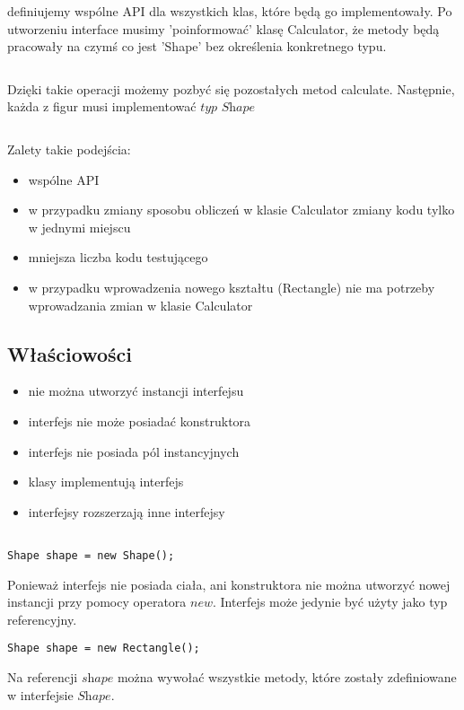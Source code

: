 \documentclass[11pt]{article}
\begin{document}
definiujemy wspólne API dla wszystkich klas, które będą go implementowały. Po utworzeniu interface musimy 'poinformować' klasę Calculator, że metody będą pracowały na czymś co jest 'Shape' bez określenia konkretnego typu. 

\inputminted[bgcolor=bg,linenos=true]{java}{src/w05/CalculatorRefactor.java}

Dzięki takie operacji możemy pozbyć się pozostałych metod calculate. Następnie, każda z figur musi implementować $\textit{typ Shape}$ 

\inputminted[bgcolor=bg,linenos=true]{java}{src/w05/Calculatorinterface.java}

Zalety takie podejścia:
\begin{itemize}
\item wspólne API
\item w przypadku zmiany sposobu obliczeń w klasie Calculator zmiany kodu tylko w jednymi miejscu
\item mniejsza liczba kodu testującego
\item w przypadku wprowadzenia nowego kształtu (Rectangle) nie ma potrzeby wprowadzania zmian w klasie Calculator
\end{itemize}
\subsection{Właściowości}
\begin{itemize}
\item nie można utworzyć instancji interfejsu
\item interfejs nie może posiadać konstruktora
\item interfejs nie posiada pól instancyjnych
\item klasy implementują interfejs
\item interfejsy rozszerzają inne interfejsy
\end{itemize}
\begin{verbatim}

Shape shape = new Shape();

\end{verbatim}
Ponieważ interfejs nie posiada ciała, ani konstruktora nie można utworzyć nowej instancji przy pomocy operatora $\textit{new}$.
Interfejs może jedynie być użyty jako typ referencyjny.\\
\begin{verbatim}
Shape shape = new Rectangle(); 
\end{verbatim}
Na referencji $\textit{shape}$ można wywołać wszystkie metody, które zostały zdefiniowane w interfejsie $\textit{Shape}$.
\end{document}
